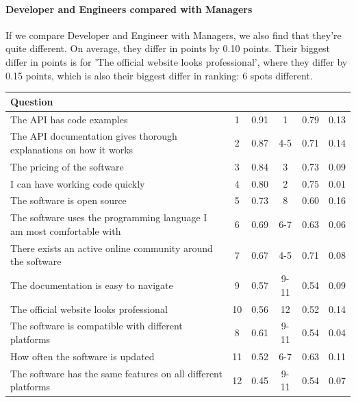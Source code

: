 \documentclass{article}
\begin{document}
\paragraph{Developer and Engineers compared with Managers}

If we compare Developer and Engineer with Managers, we also find that
they're quite different. On average, they differ in points by 0.10
points. Their biggest differ in points is for 'The official website
looks professional', where they differ by 0.15 points, which is also
their biggest differ in ranking: 6 spots different.

\begin{table}[]
\centering
\begin{tabularx}{\columnwidth}{X|c:c|c:c|c|}

\textbf{Question}                                                    &     & &   & & \\ \hline
The API has code examples & 1 & 0.91       & 1 & 0.79 & 0.13  \\ \hline
The API documentation gives thorough explanations on how it works & 2 & 0.87 & 4-5 & 0.71 & 0.14  \\ \hline
The pricing of the software & 3 & 0.84 &            3 & 0.73 & 0.09  \\ \hline
I can have working code quickly & 4 & 0.80 & 2 & 0.75 & 0.01  \\ \hline
The software is open source                                           & 5 & 0.73 & 8 & 0.60 & 0.16  \\ \hline
The software uses the programming language I am most comfortable with & 6 & 0.69 & 6-7 & 0.63 & 0.06  \\ \hline
There exists an active online community around the software & 7 & 0.67 & 4-5 & 0.71 & 0.08  \\ \hline
The documentation is easy to navigate & 9 & 0.57 & 9-11 & 0.54           & 0.09  \\ \hline
The official website looks professional &              10 & 0.56 & 12 & 0.52 & 0.14  \\ \hline
The software is compatible with different platforms & 8 & 0.61 & 9-11 & 0.54 & 0.04  \\ \hline
How often the software is updated & 11 & 0.52       & 6-7 & 0.63 & 0.11  \\ \hline
The software has the same features on all different platforms & 12 & 0.45 & 9-11 & 0.54 & 0.07  \\ \hline

\end{tabularx}
\end{table}
\end{document}
